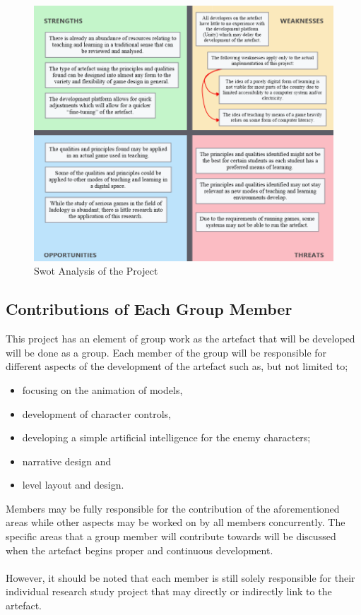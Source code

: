 \begin{figure}[H]
\centering
\includegraphics[scale=2]{Figures/swot}
\caption{Swot Analysis of the Project}
\end{figure}

\subsection{Contributions of Each Group Member}
This project has an element of group work as the artefact that will be developed will be done as a group. Each member of the group will be responsible for different aspects of the development of the artefact such as, but not limited to;
\begin{itemize}
\item focusing on the animation of models, 
\item development of character controls, 
\item developing a simple artificial intelligence for the enemy characters;
\item narrative design and 
\item level layout and design. 
\end{itemize}
Members may be fully responsible for the contribution of the aforementioned areas while other aspects may be worked on by all members concurrently. The specific areas that a group member will contribute towards will be discussed when the artefact begins proper and continuous development.
\\\\
However, it should be noted that each member is still solely responsible for their individual research study project that may directly or indirectly link to the artefact.


